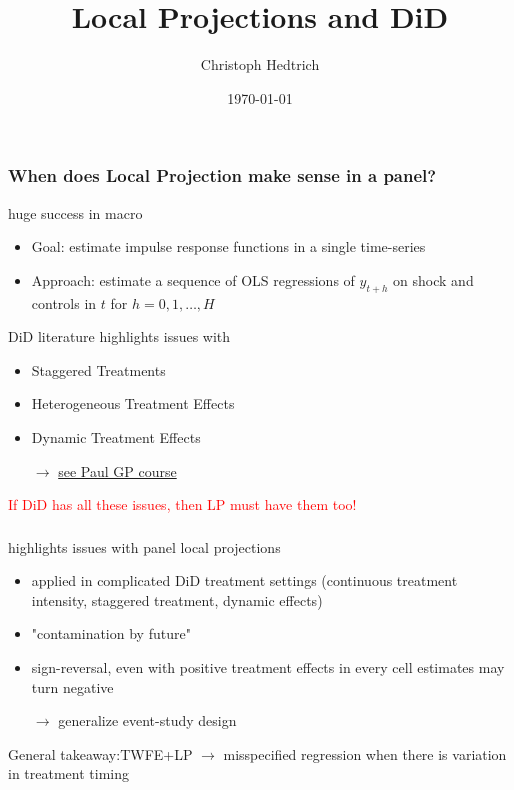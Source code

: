 \documentclass[notes,11pt, aspectratio = 169]{beamer}
\title{Local Projections and DiD}
\author{Christoph Hedtrich}
\date{\today}
\begin{document}
 
\begin{frame}
  \titlepage
\end{frame}

\begin{frame}\frametitle{When does Local Projection make sense in a panel?}
    \begin{wideitemize}
        \item \citet{jorda2005estimation} huge success in macro
            \begin{itemize}
                \item Goal: estimate impulse response functions in a single time-series 
                \item Approach: estimate a sequence of OLS regressions of $y_{t+h}$ on shock and controls in $t$ for $h = 0, 1, \dots, H$
            \end{itemize}
        \item DiD literature highlights issues with 
            \begin{itemize}
                \item Staggered Treatments 
                \item Heterogeneous Treatment Effects 
                \item Dynamic Treatment Effects 
                \item[$\rightarrow$] \href{https://github.com/paulgp/applied-methods-phd}{see Paul GP course}
            \end{itemize}
        \item \textcolor{red}{If DiD has all these issues, then LP must have them too!}
    
    \end{wideitemize}

\end{frame}



\begin{frame}\frametitle{\citet{de2022difference}}
    \begin{wideitemize}
        \item highlights issues with panel local projections 
            \begin{itemize}
                \item applied in complicated DiD treatment settings (continuous treatment intensity, staggered treatment, dynamic effects)
                \item "contamination by future"
                \item sign-reversal, even with positive treatment effects in every cell estimates may turn negative
                \item[$\rightarrow$] generalize event-study design  
            \end{itemize}
        \item General takeaway:TWFE+LP $\rightarrow$ misspecified regression when there is variation in treatment timing
      
    \end{wideitemize}

\end{frame}
\end{document}

